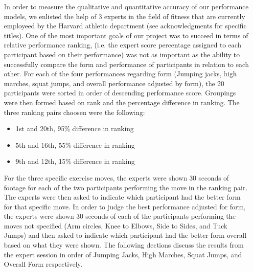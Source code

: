 In order to measure the qualitative and quantitative accuracy of our performance models, we enlisted the help of 3 experts in the field of fitness that are currently employeed by the Harvard athletic department (see acknowledgments for specific titles).  One of the most important goals of our project was to succeed in terms of relative performance ranking, (i.e. the expert score percentage assigned to each participant based on their performance) was not as important as the ability to successfully compare the form and performance of participants in relation to each other.  For each of the four performances regarding form (Jumping jacks, high marches, squat jumps, and overall performance adjusted by form), the 20 participants were sorted in order of descending performance score.  Groupings were then formed based on rank and the percentage difference in ranking.  The three ranking pairs choosen were the following: \\
\begin{itemize}
	\item{1st and 20th, 95\% difference in ranking} \\
	\item{5th and 16th, 55\% difference in ranking} \\
	\item{9th and 12th, 15\% difference in ranking} 
\end{itemize}
For the three specific exercise moves, the experts were shown 30 seconds of footage for each of the two participants performing the move in the ranking pair.  The experts were then asked to indicate which participant had the better form for that specific move.  In order to judge the best performance adjusted for form, the experts were shown 30 seconds of each of the participants performing the moves not specified (Arm circles, Knee to Elbows, Side to Sides, and Tuck Jumps) and then asked to indicate which participant had the better form overall based on what they were shown.  The following dections discuss the results from the expert session in order of Jumping Jacks, High Marches, Squat Jumps, and Overall Form respectively.\\

